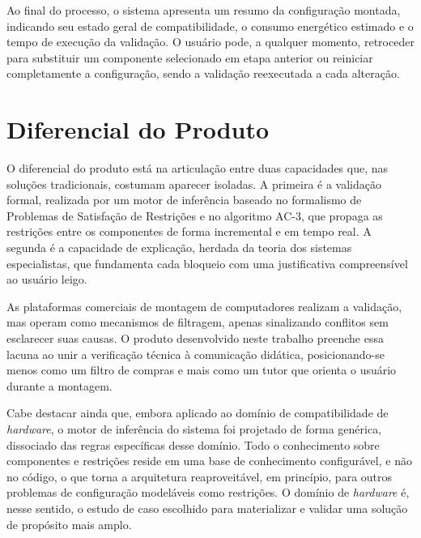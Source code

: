 Ao final do processo, o sistema apresenta um resumo da configuração montada, indicando seu estado geral de compatibilidade, o consumo energético estimado e o tempo de execução da validação. O usuário pode, a qualquer momento, retroceder para substituir um componente selecionado em etapa anterior ou reiniciar completamente a configuração, sendo a validação reexecutada a cada alteração.

\section{Diferencial do Produto}
\label{sec:diferencial-produto}

O diferencial do produto está na articulação entre duas capacidades que, nas soluções tradicionais, costumam aparecer isoladas. A primeira é a validação formal, realizada por um motor de inferência baseado no formalismo de Problemas de Satisfação de Restrições e no algoritmo AC-3, que propaga as restrições entre os componentes de forma incremental e em tempo real. A segunda é a capacidade de explicação, herdada da teoria dos sistemas especialistas, que fundamenta cada bloqueio com uma justificativa compreensível ao usuário leigo.

As plataformas comerciais de montagem de computadores realizam a validação, mas operam como mecanismos de filtragem, apenas sinalizando conflitos sem esclarecer suas causas. O produto desenvolvido neste trabalho preenche essa lacuna ao unir a verificação técnica à comunicação didática, posicionando-se menos como um filtro de compras e mais como um tutor que orienta o usuário durante a montagem.

Cabe destacar ainda que, embora aplicado ao domínio de compatibilidade de \textit{hardware}, o motor de inferência do sistema foi projetado de forma genérica, dissociado das regras específicas desse domínio. Todo o conhecimento sobre componentes e restrições reside em uma base de conhecimento configurável, e não no código, o que torna a arquitetura reaproveitável, em princípio, para outros problemas de configuração modeláveis como restrições. O domínio de \textit{hardware} é, nesse sentido, o estudo de caso escolhido para materializar e validar uma solução de propósito mais amplo.